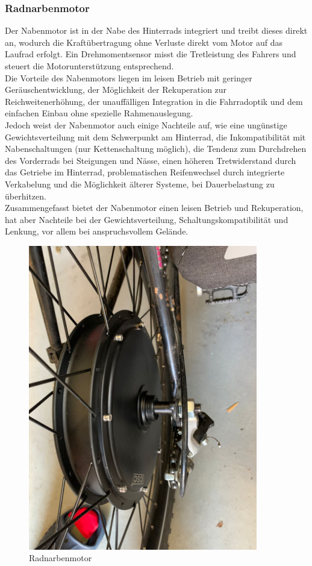 \subsubsection*{Radnarbenmotor}
Der Nabenmotor ist in der Nabe des Hinterrads integriert und treibt dieses direkt an, wodurch die Kraftübertragung ohne Verluste direkt vom Motor auf das Laufrad erfolgt. Ein Drehmomentsensor misst die Tretleistung des Fahrers und steuert die Motorunterstützung entsprechend.\\

Die Vorteile des Nabenmotors liegen im leisen Betrieb mit geringer Geräuschentwicklung, der Möglichkeit der Rekuperation zur Reichweitenerhöhung, der unauffälligen Integration in die Fahrradoptik und dem einfachen Einbau ohne spezielle Rahmenauslegung.\\

Jedoch weist der Nabenmotor auch einige Nachteile auf, wie eine ungünstige Gewichtsverteilung mit dem Schwerpunkt am Hinterrad, die Inkompatibilität mit Nabenschaltungen (nur Kettenschaltung möglich), die Tendenz zum Durchdrehen des Vorderrads bei Steigungen und Nässe, einen höheren Tretwiderstand durch das Getriebe im Hinterrad, problematischen Reifenwechsel durch integrierte Verkabelung und die Möglichkeit älterer Systeme, bei Dauerbelastung zu überhitzen.\\

Zusammengefasst bietet der Nabenmotor einen leisen Betrieb und Rekuperation, hat aber Nachteile bei der Gewichtsverteilung, Schaltungskompatibilität und Lenkung, vor allem bei anspruchsvollem Gelände.\\

\begin{figure}[h]
    \centering
    \includegraphics[width=10cm]{images/Radnabenmotor.jpg}
    \caption{Radnarbenmotor\cite{lorenz_scherrer_selbst_2023}}%
    \label{fig:9}
\end{figure}


